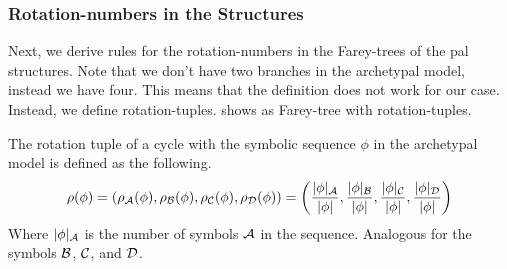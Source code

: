 \subsubsection{Rotation-numbers in the  Structures}

Next, we derive rules for the rotation-numbers in the Farey-trees of the \gls{pal} structures.
Note that we don't have two branches in the archetypal model, instead we have four.
This means that the definition  does not work for our case.
Instead, we define rotation-tuples.
 shows as Farey-tree with rotation-tuples.

\begin{definition}
	The rotation tuple of a cycle with the symbolic sequence $\phi$ in the archetypal model is defined as the following.
	\begin{align}
		\rho(\phi)
		= \left(\rho_{\mathcal{A}}(\phi), \rho_{\mathcal{B}}(\phi), \rho_{\mathcal{C}}(\phi), \rho_{\mathcal{D}}(\phi)\right)
		= \left(\dfrac{|\phi|_{\mathcal{A}}}{|\phi|}, \dfrac{|\phi|_{\mathcal{B}}}{|\phi|}, \dfrac{|\phi|_{\mathcal{C}}}{|\phi|}, \dfrac{|\phi|_{\mathcal{D}}}{|\phi|}\right)
	\end{align}
	Where $|\phi|_{\mathcal{A}}$ is the number of symbols $\mathcal{A}$ in the sequence.
	Analogous for the symbols $\mathcal{B}$, $\mathcal{C}$, and $\mathcal{D}$.
\end{definition}

